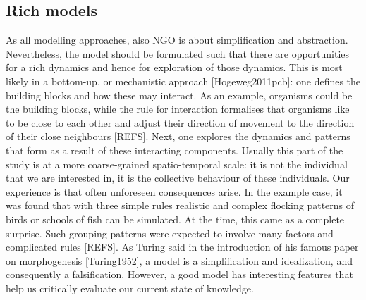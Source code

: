 \subsection{Rich models}

As all modelling approaches, also NGO is about simplification and abstraction. Nevertheless, the model should be formulated such that there are opportunities for a rich dynamics and hence for exploration of those dynamics. This is most likely in a bottom-up, or mechanistic approach [Hogeweg2011pcb]: one defines the building blocks and how these may interact. As an example, organisms could be the building blocks, while the rule for interaction formalises that organisms like to be close to each other and adjust their direction of movement to the direction of their close neighbours [REFS]. Next, one explores the dynamics and patterns that form as a result of these interacting components. Usually this part of the study is at a more coarse-grained spatio-temporal scale: it is not the individual that we are interested in, it is the collective behaviour of these individuals. Our experience is that often unforeseen consequences arise. In the example case, it was found that with three simple rules realistic and complex flocking patterns of birds or schools of fish can be simulated. At the time, this came as a complete surprise. Such grouping patterns were expected to involve many factors and complicated rules [REFS]. As Turing said in the introduction of his famous paper on morphogenesis [Turing1952], a model is a simplification and idealization, and consequently a falsification. However, a good model has interesting features that help us critically evaluate our current state of knowledge.